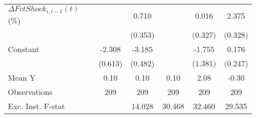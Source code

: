 {\begin{tabular}{l*{5}{c}}
\addlinespace
$ \Delta FctShock_{i,t-1}(t)$ (\%)&                     &       0.710\sym{*}  &                     &       0.016         &       2.375\sym{***}\\
                    &                     &     (0.353)         &                     &     (0.327)         &     (0.328)         \\
\addlinespace
Constant            &      -2.308\sym{***}&      -3.185\sym{***}&                     &      -1.755         &       0.176         \\
                    &     (0.613)         &     (0.482)         &                     &     (1.381)         &     (0.247)         \\
\midrule
Mean Y              &        0.10         &        0.10         &        0.10         &        2.08         &       -0.30         \\
Observations        &         209         &         209         &         209         &         209         &         209         \\
Exc. Inst. F-stat   &                     &      14.028         &      30.468         &      32.460         &      29.535         \\
\bottomrule
\end{tabular}
}
